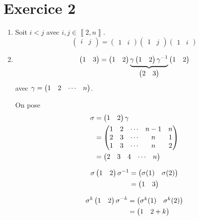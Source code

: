 \part{Exercice 2}

\begin{enumerate}
	\item Soit $i<j$ avec $i,j \in \left\llbracket 2,n \right\rrbracket$.
		\[
			\begin{pmatrix}
				i&j
			\end{pmatrix} = \begin{pmatrix}
				1&i
			\end{pmatrix}  \begin{pmatrix}
				1&j
			\end{pmatrix} \begin{pmatrix}
				1&i
			\end{pmatrix} 
		\]

	\item \[
			\begin{pmatrix} 1&3 \end{pmatrix} = \begin{pmatrix} 1&2 \end{pmatrix} \underbrace{\gamma \begin{pmatrix} 1&2 \end{pmatrix} \gamma^{-1}}_{\begin{pmatrix} 2&3 \end{pmatrix}}\begin{pmatrix} 1&2 \end{pmatrix}
		\] avec $\gamma = \begin{pmatrix} 1&2&\cdots&n \end{pmatrix}$.

		On pose
		\begin{align*}
			\sigma &= \begin{pmatrix} 1&2 \end{pmatrix} \gamma\\
			&= \begin{pmatrix}
				1&2&\cdots&n-1&n\\
				2&3&\cdots&n&1\\
				1&3&\cdots&n&2
			\end{pmatrix} \\
			&= \begin{pmatrix} 2&3&4&\cdots&n \end{pmatrix} \\
		\end{align*}

		\begin{align*}
			\sigma \begin{pmatrix} 1&2 \end{pmatrix} \sigma^{-1} &= \begin{pmatrix} \sigma(1)&\sigma(2) \end{pmatrix} \\
			&= \begin{pmatrix} 1&3 \end{pmatrix} \\
		\end{align*}

		\begin{align*}
			\sigma^k \begin{pmatrix} 1&2 \end{pmatrix}\sigma^{-k} &= \begin{pmatrix} \sigma^k(1)&\sigma^k(2) \end{pmatrix} \\
			&= \begin{pmatrix} 1&2+k \end{pmatrix} \\
		\end{align*}
\end{enumerate}

